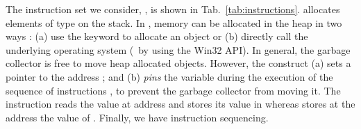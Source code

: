 \documentclass[10pt]{sigplanconf}
\begin{document}
The instruction set we consider, \uMSIL, is shown in Tab.~\ref{tab:instructions}.
    allocates  elements of type  on the stack.
In \NET, memory can be allocated in the heap in  two ways : (a) use the  keyword to allocate an object or (b) directly call the underlying operating system (\eg\ by using the  Win32 API).
In general, the garbage collector is free to move heap allocated objects.
However, the construct  (a) sets a pointer  to the address ; and (b) \emph{pins} the variable  during the execution of the sequence of instructions , to prevent the garbage collector from moving it.
 The instruction  reads the value at address  and stores its value in  whereas  stores at the address  the value of .
Finally, we have instruction sequencing.
\end{document}

